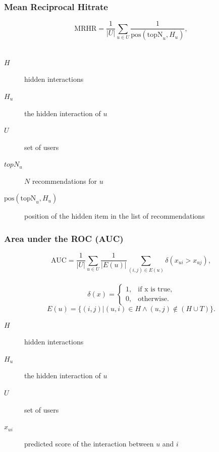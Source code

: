 \documentclass[mathserif]{beamer}
\begin{document}
\begin{frame} 
    \frametitle{Mean Reciprocal Hitrate~\cite{DBLP:conf/icdm/NingK11}}
\begin{equation} 
\text{MRHR}=\frac{1}{|U|} \sum_{u \in U} \frac{1}{\text{pos}(\text{topN}_{u},H_{u})},
\end{equation}\\
\vspace{6.4mm}
\begin{description}
    \item[$H$] hidden interactions\\
    \item[$H_u$] the hidden interaction of $u$\\
    \item[$U$] set of users
    \item[$topN_u$] $N$ recommendations for $u$
    \item[$\text{pos}(\text{topN}_{u},H_{u})$] position of the hidden item in the list of recommendations
\end{description}
\end{frame}

\begin{frame} 
    \frametitle{Area under the ROC (AUC)~\cite{Rendle:2009:BBP:1795114.1795167}}
\begin{equation} 
\text{AUC}=\frac{1}{|U|}\sum_{u \in U} \frac{1}{|E(u)|} 
\sum_{(i,j) \in E(u)} \delta(x_{ui}>x_{uj}),
\end{equation}\\
\begin{equation}
\delta(x)=\begin{cases}1, & \text{if x is true}, \\
                       0, & \text{otherwise.}
\end{cases}
\end{equation}
\begin{equation}
E(u) =\{(i,j)|(u,i) \in H \land (u,j) \not\in (H \cup T)\}.
\end{equation}
\begin{description}
    \item[$H$] hidden interactions\\
    \item[$H_u$] the hidden interaction of $u$\\
    \item[$U$] set of users
    \item[$x_{ui}$] predicted score of the interaction between $u$ and $i$
\end{description}
\end{frame}
\end{document}
